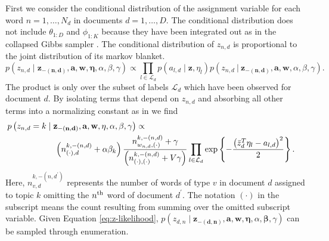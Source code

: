 \documentclass{article}
\begin{document}
First we consider the conditional distribution of the assignment variable
for each word $n=1,\ldots,N_{d}$ in documents $d=1,\ldots,D$. The
conditional distribution does not include $\theta_{1:D}$ and $\phi_{1:K}$
because they have been integrated out as in the collapsed Gibbs sampler
\citep{Griffiths04}. The conditional distribution of $z_{n,d}$ is
proportional to the joint distribution of its markov blanket. %
\begin{equation}
p\left(z_{n,d}\mid\mathbf{z_{-\left(n,d\right)}},\mathbf{a},\mathbf{w},\mathbf{\eta},\alpha,\beta,\gamma\right)\propto\prod_{l\in\mathcal{L}_{d}}p\left(a_{l,d}\mid\mathbf{z},\eta_{l}\right)p\left(z_{n,d}\ |\ \mathbf{z_{-\left(n,d\right)}},\mathbf{a},\mathbf{w},\alpha,\beta,\gamma\right).\end{equation}
 The product is only over the subset of labels $\mathcal{L}_{d}$
which have been observed for document $d$. By isolating terms that
depend on $z_{n,d}$ and absorbing all other terms into a normalizing
constant as in \citep{Griffiths04} we find \begin{eqnarray}
\lefteqn{p\left(z_{n,d}=k\mid\mathbf{z_{-\left(n,d\right)}},\mathbf{a},\mathbf{w},\mathbf{\eta},\alpha,\beta,\gamma\right)\propto}\nonumber \\
 & \hspace{2cm}\left(n_{\left(\cdot\right),d}^{k,-\left(n,d\right)}+\alpha\beta_{k}\right)\frac{n_{w_{n,d},\left(\cdot\right)}^{k,-\left(n,d\right)}+\gamma}{\left(n_{\left(\cdot\right),\left(\cdot\right)}^{k,-\left(n,d\right)}+V\gamma\right)}\prod_{l\in\mathcal{L}_{d}}\exp\left\{ -\frac{\left(\bar{z}_{d}^{T}\eta_{l}-a_{l,d}\right)^{2}}{2}\right\} .\label{eq:z-likelihood}\end{eqnarray}
 Here, $n_{v,d}^{k,-\left(n,d^{\prime}\right)}$ represents the number
of words of type $v$ in document $d$ assigned to topic $k$ omitting
the $n^{{\rm th}}$ word of document $d^{\prime}$. The notation $(\cdot)$
in the subscript means the count resulting from summing over the omitted
subscript variable. Given Equation \ref{eq:z-likelihood}, $p\left(z_{d,n}\mid\mathbf{z_{-\left(d,n\right)}},\mathbf{a},\mathbf{w},\mathbf{\eta},\alpha,\mathbf{\beta},\gamma\right)$
can be sampled through enumeration. 
\end{document}
